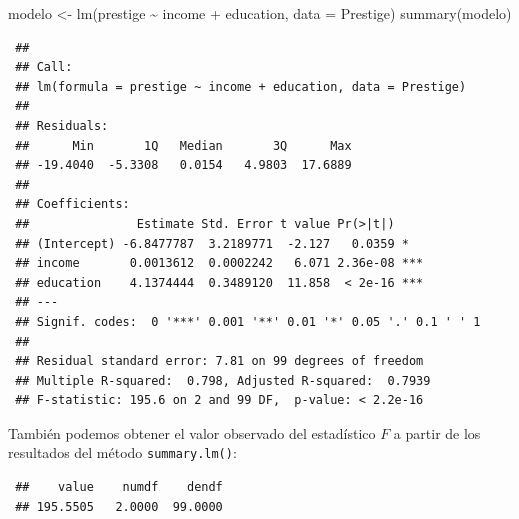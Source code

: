 \documentclass[
]{book}
\newenvironment{Shaded}{\begin{snugshade}}{\end{snugshade}}
\newcommand{\AttributeTok}[1]{\textcolor[rgb]{0.77,0.63,0.00}{#1}}
\newcommand{\CommentTok}[1]{\textcolor[rgb]{0.56,0.35,0.01}{\textit{#1}}}
\newcommand{\DecValTok}[1]{\textcolor[rgb]{0.00,0.00,0.81}{#1}}
\newcommand{\FunctionTok}[1]{\textcolor[rgb]{0.00,0.00,0.00}{#1}}
\newcommand{\NormalTok}[1]{#1}
\newcommand{\OtherTok}[1]{\textcolor[rgb]{0.56,0.35,0.01}{#1}}
\newcommand{\SpecialCharTok}[1]{\textcolor[rgb]{0.00,0.00,0.00}{#1}}
\theoremstyle{break}
\theoremstyle{nonumberplain}
\renewcommand{\CommentTok}[1]{\textcolor[rgb]{0.41,0.41,0.41}{\texttt{#1}}}
\begin{document}
\begin{Shaded}
\begin{Highlighting}[]
\NormalTok{modelo }\OtherTok{\textless{}{-}} \FunctionTok{lm}\NormalTok{(prestige }\SpecialCharTok{\textasciitilde{}}\NormalTok{ income }\SpecialCharTok{+}\NormalTok{ education, }\AttributeTok{data =}\NormalTok{ Prestige)}
\FunctionTok{summary}\NormalTok{(modelo)}
\end{Highlighting}
\end{Shaded}

\begin{verbatim}
 ## 
 ## Call:
 ## lm(formula = prestige ~ income + education, data = Prestige)
 ## 
 ## Residuals:
 ##      Min       1Q   Median       3Q      Max 
 ## -19.4040  -5.3308   0.0154   4.9803  17.6889 
 ## 
 ## Coefficients:
 ##               Estimate Std. Error t value Pr(>|t|)    
 ## (Intercept) -6.8477787  3.2189771  -2.127   0.0359 *  
 ## income       0.0013612  0.0002242   6.071 2.36e-08 ***
 ## education    4.1374444  0.3489120  11.858  < 2e-16 ***
 ## ---
 ## Signif. codes:  0 '***' 0.001 '**' 0.01 '*' 0.05 '.' 0.1 ' ' 1
 ## 
 ## Residual standard error: 7.81 on 99 degrees of freedom
 ## Multiple R-squared:  0.798, Adjusted R-squared:  0.7939 
 ## F-statistic: 195.6 on 2 and 99 DF,  p-value: < 2.2e-16
\end{verbatim}

También podemos obtener el valor observado del estadístico \(F\)
a partir de los resultados del método \texttt{summary.lm()}:

\begin{Shaded}
\end{Shaded}

\begin{verbatim}
 ##    value    numdf    dendf 
 ## 195.5505   2.0000  99.0000
\end{verbatim}
\end{document}
